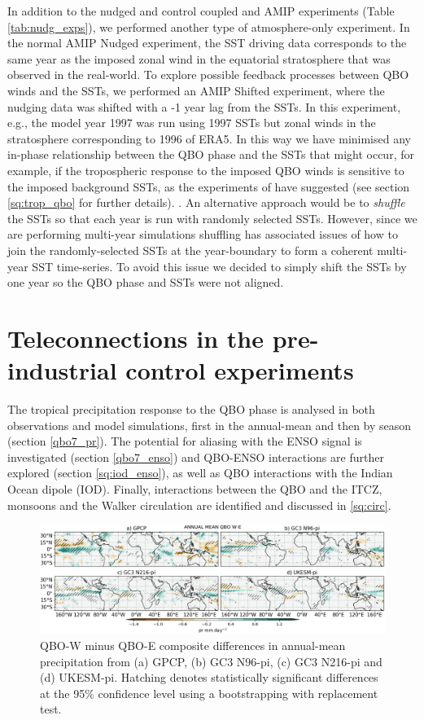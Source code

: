 In addition to the nudged and control coupled and AMIP experiments (Table \ref{tab:nudg_exps}), we performed another type of atmosphere-only experiment. In the normal AMIP Nudged experiment, the SST driving data corresponds to the same year as the imposed zonal wind in the equatorial stratosphere that was observed in the real-world. To explore possible feedback processes between QBO winds and the SSTs, we performed an AMIP Shifted experiment, where the nudging data was shifted with a -1 year lag from the SSTs. In this experiment, e.g., the model year 1997 was run using 1997 SSTs but zonal winds in the stratosphere corresponding to 1996 of ERA5. In this way we have minimised any in-phase relationship between the QBO phase and the SSTs that might occur, for example, if the tropospheric response to the imposed QBO winds is sensitive to the imposed background SSTs, as the experiments of \cite{nie2015} have suggested (see section \ref{sq:trop_qbo} for further details). . 
An alternative approach would be to \textit{shuffle} the SSTs so that each year is run with randomly selected SSTs. However, since we are performing multi-year simulations shuffling has associated issues of how to join the randomly-selected SSTs at the year-boundary to form a coherent multi-year SST time-series. To avoid this issue we decided to simply shift the SSTs by one year so the QBO phase and SSTs were not aligned.

  
\section{Teleconnections in the pre-industrial control experiments}\label{sq:cmip6_qbo}

The tropical precipitation response to the QBO phase is analysed in both observations and model simulations, first in the annual-mean and then by season (section \ref{qbo7_pr}).  The potential for aliasing with the ENSO signal is investigated (section \ref{qbo7_enso}) and QBO-ENSO interactions are further explored (section \ref{sq:iod_enso}), as well as QBO interactions with the Indian Ocean dipole (IOD). Finally, interactions between the QBO and the ITCZ, monsoons and the Walker circulation are identified and discussed in \ref{sq:circ}. 

\begin{figure}[t!]
\centering
 \includegraphics[width=\linewidth]{figures/piprclimqbowqboe.png}
\caption[Annual mean precipitation composite difference QBO W-E ]{ QBO-W minus QBO-E composite differences in annual-mean precipitation from (a) GPCP, (b) GC3 N96-pi, (c) GC3 N216-pi and (d) UKESM-pi. Hatching denotes statistically significant differences at the 95\% confidence level using a bootstrapping with replacement test. }
\label{fig:qboclim}
\end{figure}


